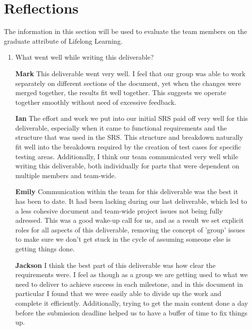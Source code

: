 \documentclass[12pt, titlepage]{article}
\begin{document}
\section*{Reflections}

The information in this section will be used to evaluate the team members on the
graduate attribute of Lifelong Learning.



\begin{enumerate}[leftmargin=*]
  \item What went well while writing this deliverable?
  
  \textbf{Mark} This deliverable went very well. I feel that our group was able to work separately on 
  different sections of the document, yet when the changes were merged together, the results fit well 
  together. This suggests we operate together smoothly without need of excessive feedback.

  \textbf{Ian} The effort and work we put into our initial SRS paid off very well for this deliverable, 
  especially when it came to functional requirements and the structure that was used in the SRS. This 
  structure and breakdown naturally fit well into the breakdown required by the creation of test cases 
  for specific testing areas. Additionally, I think our team communicated very well while writing this 
  deliverable, both individually for parts that were dependent on multiple members and team-wide.

  \textbf{Emily} Communication within the team for this deliverable was the best it has been to date. 
  It had been lacking during our last deliverable, which led to a less cohesive document and team-wide
  project issues not being fully adressed. This was a good wake-up call for us, and as a result we set
  explicit roles for all aspects of this deliverable, removing the concept of 'group' issues to make 
  sure we don't get stuck in the cycle of assuming someone else is getting things done.

  \textbf{Jackson} I think the best part of this deliverable was how clear the requirements were. I feel as 
  though as a group we are getting used to what we need to deliver to achieve success in each milestone, and in 
  this document in particular I found that we were easily able to divide up the work and complete it efficiently. 
  Additionally, trying to get the main content done a day before the submission deadline helped us to have a buffer 
  of time to fix things up.
  

\end{enumerate}
\end{document}
